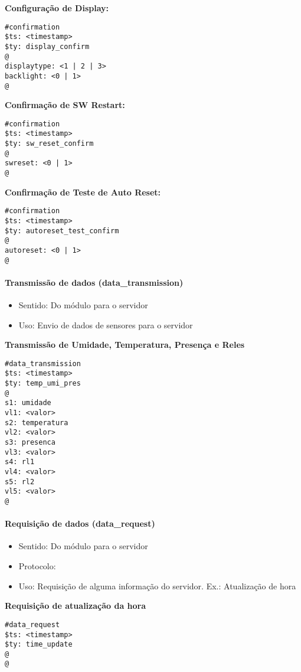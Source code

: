 \textbf{Configuração de Display:}
\begin{lstlisting}
#confirmation
$ts: <timestamp>
$ty: display_confirm
@
displaytype: <1 | 2 | 3>
backlight: <0 | 1>
@
\end{lstlisting}

\textbf{Confirmação de SW Restart:}
\begin{lstlisting}
#confirmation
$ts: <timestamp>
$ty: sw_reset_confirm
@
swreset: <0 | 1>
@
\end{lstlisting}

\textbf{Confirmação de Teste de Auto Reset:}
\begin{lstlisting}
#confirmation
$ts: <timestamp>
$ty: autoreset_test_confirm
@
autoreset: <0 | 1>
@
\end{lstlisting}

\paragraph{Transmissão de dados (data\_transmission)}
\begin{itemize}
\item Sentido: Do módulo para o servidor
\item Uso: Envio de dados de sensores para o servidor
\end{itemize}

\textbf{Transmissão de Umidade, Temperatura, Presença e Reles}
\begin{lstlisting}
#data_transmission
$ts: <timestamp>
$ty: temp_umi_pres
@
s1: umidade
vl1: <valor>
s2: temperatura
vl2: <valor>
s3: presenca
vl3: <valor>
s4: rl1
vl4: <valor>
s5: rl2
vl5: <valor>
@
\end{lstlisting}

\paragraph{Requisição de dados (data\_request)}
\begin{itemize}
\item Sentido: Do módulo para o servidor
\item Protocolo: \wmqtt{}
\item Uso: Requisição de alguma informação do servidor. Ex.: Atualização de hora
\end{itemize}

\textbf{Requisição de atualização da hora}
\begin{lstlisting}
#data_request
$ts: <timestamp>
$ty: time_update
@
@
\end{lstlisting}

